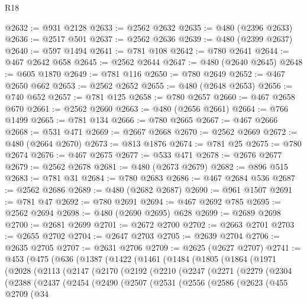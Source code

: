 \begin{lexlean}{R18}
\begin{coremodule}
{{{{{{{{{{{{{{{{{{{{{{{{{{{{{{{{{{{{{{{{{{{{{{{{{{{{{{{{{{{{{{{{{{{{{{{{{{{{{{{{{{{{{{{{{{{{{{{{{{{{{{{{{{{{{@2632 := @931 @2128
@2633 := @2562 @2632
@2635 := @480 (@2396 @2633)
@2636 := @2517 @501
@2637 := @2562 @2636
@2639 := @480 (@2399 @2637)
@2640 := @597 @1494
@2641 := @781 @108
@2642 := @780 @2641
@2644 := @467 @2642 @658
@2645 := @2562 @2644
@2647 := @480 (@2640 @2645)
@2648 := @605 @1870
@2649 := @781 @116
@2650 := @780 @2649
@2652 := @467 @2650 @662
@2653 := @2562 @2652
@2655 := @480 (@2648 @2653)
@2656 := @740 @652
@2657 := @781 @125
@2658 := @780 @2657
@2660 := @467 @2658 @670
@2661 := @2562 @2660
@2663 := @480 (@2656 @2661)
@2664 := @766 @1499
@2665 := @781 @134
@2666 := @780 @2665
@2667 := @467 @2666
@2668 := @531 @471
@2669 := @2667 @2668
@2670 := @2562 @2669
@2672 := @480 (@2664 @2670)
@2673 := @813 @1876
@2674 := @781 @25
@2675 := @780 @2674
@2676 := @467 @2675
@2677 := @533 @471
@2678 := @2676 @2677
@2679 := @2562 @2678
@2681 := @480 (@2673 @2679)
@2682 := @896 @515
@2683 := @781 @31
@2684 := @780 @2683
@2686 := @467 @2684 @536
@2687 := @2562 @2686
@2689 := @480 (@2682 @2687)
@2690 := @961 @1507
@2691 := @781 @47
@2692 := @780 @2691
@2694 := @467 @2692 @785
@2695 := @2562 @2694
@2698 := @480 (@2690 @2695) @628
@2699 := @2689 @2698
@2700 := @2681 @2699
@2701 := @2672 @2700
@2702 := @2663 @2701
@2703 := @2655 @2702
@2704 := @2647 @2703
@2705 := @2639 @2704
@2706 := @2635 @2705
@2707 := @2631 @2706
@2709 := @2625 (@2627 @2707)
@2741 := @453
    (@475
      (@636
        (@1387
          (@1422
            (@1461
              (@1484
                (@1805
                  (@1864
                    (@1971
                      (@2028
                        (@2113
                          (@2147
                            (@2170
                              (@2192
                                (@2210
                                  (@2247
                                    (@2271
                                      (@2279
                                        (@2304
                                          (@2388
                                            (@2437
                                              (@2454
                                                (@2490
                                                  (@2507
                                                    (@2531
                                                      (@2556
                                                        (@2586
                                                          (@2623
                                                            (@455
                                                              @2709
                                                              (@34
}}}}}}}}}}}}}}}}}}}}}}}}}}}}}}}}}}}}}}}}}}}}}}}}}}}}}}}}}}}}}}}}}}}}}}}}}}}}}}}}}}}}}}}}}}}}}}}}}}}}}}}}}}}}}
\end{coremodule}
\end{lexlean}
